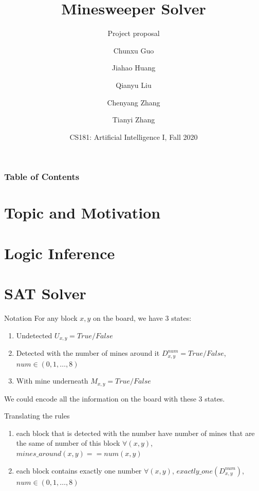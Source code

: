 \documentclass[aspectratio=169]{beamer}
\title[Minesweeper Solver] %
{Minesweeper Solver}
\subtitle{Project proposal}
\author[Team 4] %
{Chunxu Guo \and Jiahao Huang \and Qianyu Liu\\ \and Chenyang Zhang \and Tianyi Zhang}
\institute[ShanghaiTech] %
{
  ShanghaiTech University
}
\date[Dec. 14] %
{CS181: Artificial Intelligence I, Fall 2020}
\begin{document}
\frame{\titlepage}


\begin{frame}
\frametitle{Table of Contents}
\tableofcontents
\end{frame}


\section{Topic and Motivation}






\section{Logic Inference}






\section{SAT Solver}
\begin{frame}{Notation}
For any block $x,y$ on the board, we have 3 states:
\begin{enumerate}
    \item Undetected $U_{x,y}=True/False$
    \item Detected with the number of mines around it $D_{x,y}^{num}=True/False$, $num\in (0,1,\ldots,8)$
    \item With mine underneath $M_{x,y}=True/False$
\end{enumerate}
We could encode all the information on the board with these 3 states.

\end{frame}

\begin{frame}{Translating the rules}
    \begin{enumerate}
        \item each block that is detected with the number have number of mines that are the same of number of this block $\forall (x,y)$, $mines\_around(x,y)==num(x,y)$
        \item each block contains exactly one number $ \forall (x,y)$, $exactly\_one(D_{x,y}^{num})$, $num\in (0,1,\ldots,8)$
    \end{enumerate}
\end{frame}
\end{document}
